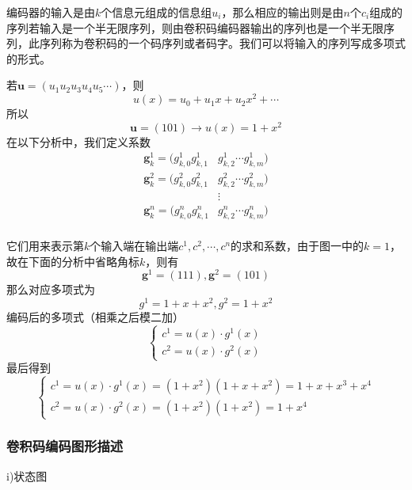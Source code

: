 编码器的输入是由$k$个信息元组成的信息组$u_i$，那么相应的输出则是由$n$个$c_i$组成的序列若输入是一个半无限序列，则由卷积码编码器输出的序列也是一个半无限序列，此序列称为卷积码的一个码序列或者码字。我们可以将输入的序列写成多项式的形式。

若$\bm{u}=(u_1u_2u_3u_4u_5\cdots)$，则
\[
u(x)=u_0+u_1x+u_2x^2+\cdots
\]
所以
\[
\bm{u}=(101)\to u(x)=1+x^2
\]
在以下分析中，我们定义系数
\begin{equation}
\begin{split}
\bm{g}_k^1=(g_{k,0}^1g_{k,1}^1 & g_{k,2}^1\cdots g_{k,m}^1) \\
\bm{g}_k^2=(g_{k,0}^2g_{k,1}^2 & g_{k,2}^2\cdots g_{k,m}^2) \\
&\vdots \\
\bm{g}_k^n=(g_{k,0}^ng_{k,1}^n & g_{k,2}^n\cdots g_{k,m}^n) \\
\end{split}
\end{equation}


它们用来表示第$k$个输入端在输出端$c^1,c^2,\cdots,c^n$的求和系数，由于图一中的$k=1$，故在下面的分析中省略角标$k$，则有
\begin{equation}
\bm{g}^1=(111),\bm{g}^2=(101)
\end{equation}
那么对应多项式为
\begin{equation}
g^1=1+x+x^2,g^2=1+x^2
\end{equation}
编码后的多项式（相乘之后模二加）
\begin{equation}
\begin{cases}
c^1=u(x)\cdot g^1(x) \\
c^2=u(x) \cdot g^2(x)
\end{cases}
\end{equation}
最后得到
\begin{equation}
\begin{cases}
c^1=u(x)\cdot g^1(x) = (1+x^2)(1+x+x^2)=1+x+x^3+x^4 \\
c^2=u(x) \cdot g^2(x) = (1+x^2)(1+x^2)=1+x^4
\end{cases}
\end{equation}

\subsubsection{卷积码编码图形描述}
i)状态图

